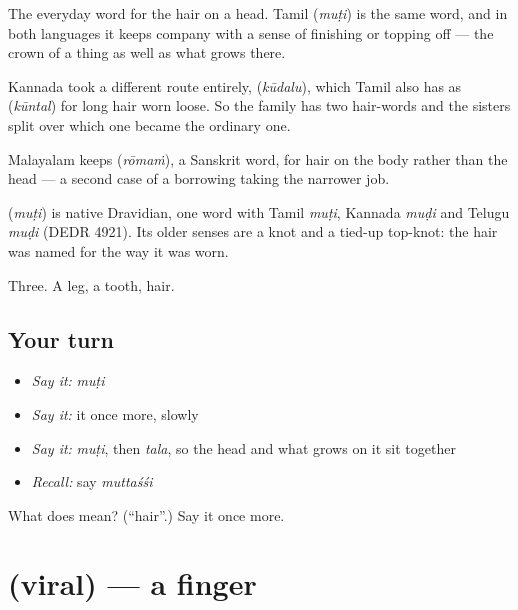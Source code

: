 The everyday word for the hair on a head. Tamil  (\emph{muṭi}) is the same word, and in both languages it keeps company with a sense of finishing or topping off — the crown of a thing as well as what grows there.

Kannada took a different route entirely,  (\emph{kūdalu}), which Tamil also has as  (\emph{kūntal}) for long hair worn loose. So the family has two hair-words and the sisters split over which one became the ordinary one.

Malayalam keeps  (\emph{rōmaṁ}), a Sanskrit word, for hair on the body rather than the head — a second case of a borrowing taking the narrower job.

\begin{cousinweb}
\textbf{} (\emph{muṭi}) is native Dravidian, one word with Tamil \emph{muṭi}, Kannada \emph{muḍi} and Telugu \emph{muḍi} (DEDR 4921). Its older senses are a knot and a tied-up top-knot: the hair was named for the way it was worn.
\end{cousinweb}

\begin{grammarlens}[title={What you've built}]
Three. A leg, a tooth, hair.
\end{grammarlens}

\subsection*{Your turn}
\begin{itemize}
\raggedright
  \item \emph{Say it:} \emph{muṭi}
  \item \emph{Say it:} it once more, slowly
  \item \emph{Say it:} \emph{muṭi}, then \emph{tala}, so the head and what grows on it sit together
  \item \emph{Recall:} say \emph{muttaśśi}
\end{itemize}

\begin{tcolorbox}[breakable,colback=teal!4,colframe=teal!35!black,title={Before you move on}]
What does  mean? (\textquotedblleft{}hair\textquotedblright{}.) Say it once more.
\end{tcolorbox}
\section[\texorpdfstring{\ml{വിരൽ} (viral)}{വിരൽ (viral)}]{ (viral) — a finger}

